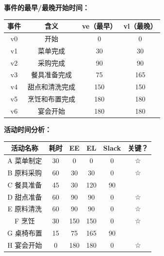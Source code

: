 \noindent\hspace*{2em}\textbf{事件的最早/最晚开始时间：}\par
\begin{center}
\fontsize{8.5pt}{11pt}\selectfont
\renewcommand{\arraystretch}{1.15}
\begin{tabular}{|c|c|c|c|}
\hline
\textbf{事件} & \textbf{含义} & \textbf{ve（最早）} & \textbf{vl（最晚）} \\ \hline
v0 & 开始 & 0 & 0 \\ \hline
v1 & 菜单完成 & 30 & 30 \\ \hline
v2 & 采购完成 & 90 & 90 \\ \hline
v3 & 餐具准备完成 & 75 & 165 \\ \hline
v4 & 甜点和清洗完成 & 150 & 150 \\ \hline
v5 & 烹饪和布置完成 & 180 & 180 \\ \hline
v6 & 宴会开始 & 180 & 180 \\ \hline
\end{tabular}
\end{center}

\noindent\hspace*{2em}\textbf{活动时间分析：}\par
\begin{center}
\fontsize{8pt}{10pt}\selectfont
\renewcommand{\arraystretch}{1.12}
\begin{tabular}{|c|c|c|c|c|c|}
\hline
\textbf{活动名称} & \textbf{耗时} & \textbf{EE} & \textbf{EL} & \textbf{Slack} & \textbf{关键？} \\ \hline
A 菜单制定 & 30 & 0 & 0 & 0 & ☆ \\ \hline
B 原料采购 & 60 & 30 & 30 & 0 & ☆ \\ \hline
C 餐具准备 & 45 & 30 & 120 & 90 & \\ \hline
D 甜点准备 & 60 & 90 & 90 & 0 & ☆ \\ \hline
E 原料清洗 & 60 & 90 & 90 & 0 & ☆ \\ \hline
F 烹饪 & 30 & 150 & 150 & 0 & ☆ \\ \hline
G 桌椅布置 & 15 & 75 & 165 & 90 & \\ \hline
H 宴会开始 & 0 & 180 & 180 & 0 & ☆ \\ \hline
\end{tabular}
\end{center}

